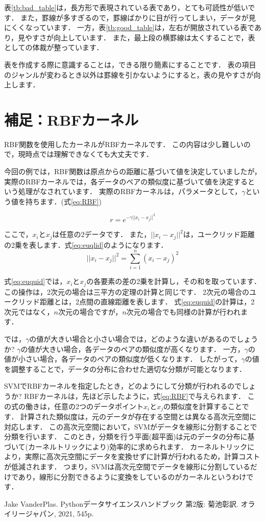 \documentclass{jarticle}
\begin{document}
表\ref{tb:bad_table}は，長方形で表現されている表であり，とても可読性が低いです．
また，罫線が多すぎるので，罫線ばかりに目が行ってしまい，データが見にくくなっています．
一方，表\ref{tb:good_table}は，左右が開放されている表であり，見やすさが向上しています．
また，最上段の横罫線は太くすることで，表としての体裁が整っています．

表を作成する際に意識することは，できる限り簡素にすることです．
表の項目のジャンルが変わるとき以外は罫線を引かないようにすると，表の見やすさが向上します．

\section{補足：RBFカーネル}
RBF関数を使用したカーネルがRBFカーネルです．
この内容は少し難しいので，現時点では理解できなくても大丈夫です．

今回の例では，RBF関数は原点からの距離に基づいて値を決定していましたが，実際のRBFカーネルでは，各データのペアの類似度に基づいて値を決定するという処理がなされています．
実際のRBFカーネルは，パラメータとして，$\gamma $という値を持ちます．(式\ref{eq:RBF})

\begin{equation}\label{eq:RBF}
  r = e^{-\gamma ||x_i - x_j||^2}
\end{equation}

ここで，$x_i$と$x_j$は任意の2データです．
また，$||x_i - x_j||^2$は，ユークリッド距離の2乗を表します．式\ref{eq:euqlid}のようになります．
\begin{equation}\label{eq:euquid}
  ||x_i - x_j||^2 = \sum_{i=1}^{n}(x_i - x_j)^2
\end{equation}

式\ref{eq:euquid}では，$x_i$と$x_j$の各要素の差の2乗を計算し，その和を取っています．
この操作は，2次元の場合は三平方の定理の計算と同じです．
2次元の場合のユークリッド距離とは，2点間の直線距離を表します．
式\ref{eq:euquid}の計算は，2次元ではなく，$n$次元の場合ですが，$n$次元の場合でも同様の計算が行われます．

では，$\gamma$の値が大きい場合と小さい場合では，どのような違いがあるのでしょうか?
$\gamma$の値が大きい場合，各データのペアの類似度が高くなります．
一方，$\gamma$の値が小さい場合，各データのペアの類似度が低くなります．
したがって，$\gamma$の値を調整することで，データの分布に合わせた適切な分類が可能となります．

SVMでRBFカーネルを指定したとき，どのようにして分類が行われるのでしょうか?
RBFカーネルは，先ほど示したように，式\ref{eq:RBF}で与えられます．
この式の働きは，任意の2つのデータポイント$x_i$と$x_j$の類似度を計算することです．
計算された類似度は，元のデータが存在する空間とは異なる高次元空間に対応します．
この高次元空間において，SVMがデータを線形に分割することで分類を行います．
このとき，分類を行う平面(超平面)は元のデータの分布に基づいて(カーネルトリックにより)効率的に求められます．
カーネルトリックにより，実際に高次元空間にデータを変換せずに計算が行われるため，計算コストが低減されます．
つまり，SVMは高次元空間でデータを線形に分割しているだけであり，線形に分割できるように変換をしているのがカーネルというわけです．


\begin{thebibliography}{99}
   Jake VanderPlas. Pythonデータサイエンスハンドブック 第2版: 菊池彰訳. オライリージャパン, 2021, 545p. \\\\
\end{thebibliography}
\end{document}
